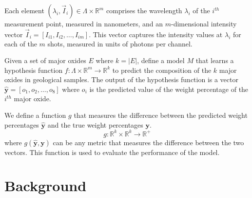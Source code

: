 Each element $(\lambda_i, \vec{I}_i) \in \Lambda \times \mathbb{R}^{m}$ comprises the wavelength $\lambda_i$ of the $i^{th}$ measurement point, measured in nanometers, and an $m$-dimensional intensity vector $\vec{I}_i = [I_{i1}, I_{i2}, \ldots, I_{im}]$.
This vector captures the intensity values at $\lambda_i$ for each of the $m$ shots, measured in units of photons per channel.

Given a set of major oxides $E$ where $k=|E|$, define a model $M$ that learns a hypothesis function $f: \Lambda \times \mathbb{R}^m \rightarrow \mathbb{R}^k$ to predict the composition of the $k$ major oxides in geological samples.
The output of the hypothesis function is a vector $\mathbf{\hat{y}} = [o_{1}, o_{2}, \ldots, o_{8}]$ where $o_{i}$ is the predicted value of the weight percentage of the $i^{th}$ major oxide.

We define a function $g$ that measures the difference between the predicted weight percentages $\mathbf{\hat{y}}$ and the true weight percentages $\mathbf{y}$.
$$
g: \mathbb{R}^k \times \mathbb{R}^k \rightarrow \mathbb{R}^{+}
$$
where $g(\mathbf{\hat{y}}, \mathbf{y})$ can be any metric that measures the difference between the two vectors. This function is used to evaluate the performance of the model.



% 
% 


\section{Background}


